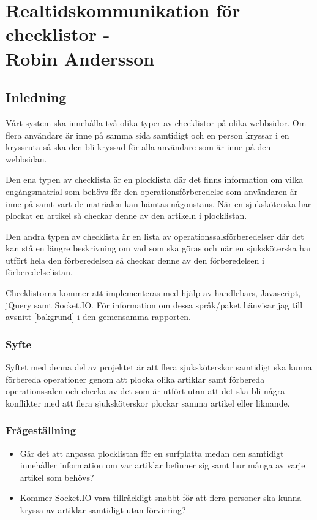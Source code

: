 \section{Realtidskommunikation för checklistor - \\Robin Andersson}
\subsection{Inledning}
Vårt system ska innehålla två olika typer av checklistor på olika webbsidor. Om flera användare är inne på samma sida samtidigt och en person kryssar i en kryssruta så ska den bli kryssad för alla användare som är inne på den webbsidan.

Den ena typen av checklista är en plocklista där det finns information om vilka engångsmatrial som behövs för den operationsförberedelse som användaren är inne på samt vart de matrialen kan hämtas någonstans. När en sjuksköterska har plockat en artikel så checkar denne av den artikeln i plocklistan.

Den andra typen av checklista är en lista av operationssalsförberedelser där det kan stå en längre beskrivning om vad som ska göras och när en sjuksköterska har utfört hela den förberedelsen så checkar denne av den förberedelsen i förberedelselistan.

Checklistorna kommer att implementeras med hjälp av handlebars, Javascript, jQuery samt Socket.IO. För information om dessa språk/paket hänvisar jag till avsnitt \ref{bakgrund} i den gemensamma rapporten.

\subsubsection{Syfte}
Syftet med denna del av projektet är att flera sjuksköterskor samtidigt ska kunna förbereda operationer genom att plocka olika artiklar samt förbereda operationssalen och checka av det som är utfört utan att det ska bli några konflikter med att flera sjuksköterskor plockar samma artikel eller liknande.

\subsubsection{Frågeställning}
\begin{itemize}
\item Går det att anpassa plocklistan för en surfplatta medan den samtidigt innehåller information om var artiklar befinner sig samt hur många av varje artikel som behövs?

\item Kommer Socket.IO vara tillräckligt snabbt för att flera personer ska kunna kryssa av artiklar samtidigt utan förvirring?
\end{itemize}

